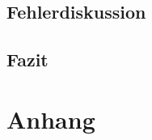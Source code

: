 \documentclass[]{article}
\begin{document}
\subsection{Fehlerdiskussion}

\subsection{Fazit}

\section{Anhang}


\newpage
\begin{thebibliography}{}


\end{thebibliography}
\end{document}
